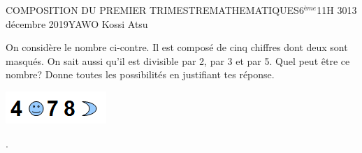 \documentclass[12pt,a4paper]{book}
\newcommand{\prof}{YAWO Kossi Atsu}
\newcommand{\matiere}{MATHEMATIQUES}
\newcommand{\classe}{6$^{ème}$}
\begin{document}
\newpage
\begin{devoir}{COMPOSITION DU PREMIER TRIMESTRE}{\matiere}{\classe}{1}{1H 30}{13 décembre 2019}{\prof}
\begin{exo}[5]
\begin{multicols}{2}
On considère le nombre ci-contre. Il est composé de cinq chiffres dont deux sont masqués. On sait aussi qu'il est divisible par 2, par 3 et par 5.
Quel peut être ce nombre? Donne toutes les possibilités en justifiant tes réponse.
\begin{center}
\includegraphics[scale=0.9]{images/compo1img1.png}
\end{center}
\vspace{1cm}
.
\end{multicols}
\end{exo}


\end{devoir}
\end{document}
